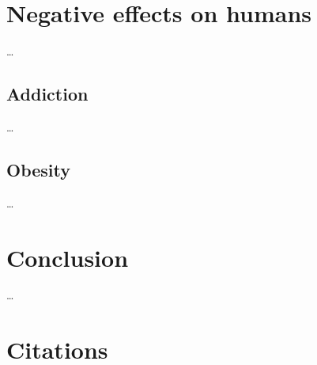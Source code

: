 \documentclass[10pt,twoside,english,a4paper]{article}
\begin{document}
\section{Negative effects on humans}
\ldots

\subsection{Addiction}
\ldots

\subsection{Obesity}
\ldots

\section{Conclusion} \label{conclusion}
\ldots

\section*{Citations} \label{cit} 
~\cite{school,behavior,education,empathy,problems,poz-neg-sol,language,learning}




\end{document}
